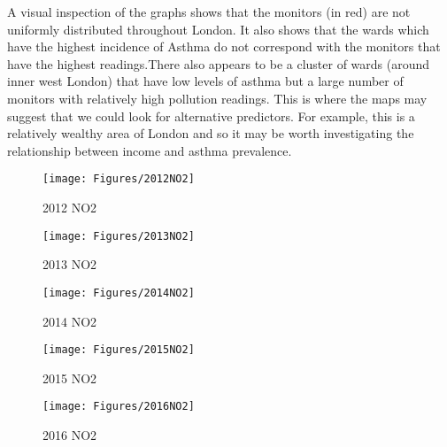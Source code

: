 A visual inspection of the graphs shows that the monitors (in red) are not uniformly distributed throughout London. It also shows that the wards which have the highest incidence of Asthma do not correspond with the monitors that have the highest readings.There also appears to be a cluster of wards (around inner west London) that have low levels of asthma but a large number of monitors with relatively high pollution readings. This is where the maps may suggest that we could look for alternative predictors. For example, this is a relatively wealthy area of London and so it may be worth investigating the relationship between income and asthma prevalence.



\begin{figure}[]
	\centering
	\hspace*{-2cm}\texttt{[image: Figures/2012NO2]}
	
	\caption[2012NO2]{2012 NO2}
	\label{fig:2012NO2}
\end{figure}
\begin{figure}[]
	\centering
	\hspace*{-2cm}\texttt{[image: Figures/2013NO2]}
	
	\caption[2013NO2]{2013 NO2}
	\label{fig:2013NO2}
\end{figure}

\begin{figure}[]
	\centering
	\hspace*{-2cm}\texttt{[image: Figures/2014NO2]}
	
	\caption[2014NO2]{2014 NO2}
	\label{fig:2014NO2}
\end{figure}
\begin{figure}[]
	\centering
	\hspace*{-2cm}\texttt{[image: Figures/2015NO2]}
	
	\caption[2015NO2]{2015 NO2}
	\label{fig:2015NO2}
\end{figure}
\begin{figure}[]
	\centering
	\hspace*{-2cm}\texttt{[image: Figures/2016NO2]}
	
	\caption[2016NO2]{2016 NO2}
	\label{fig:2016NO2}
\end{figure}

